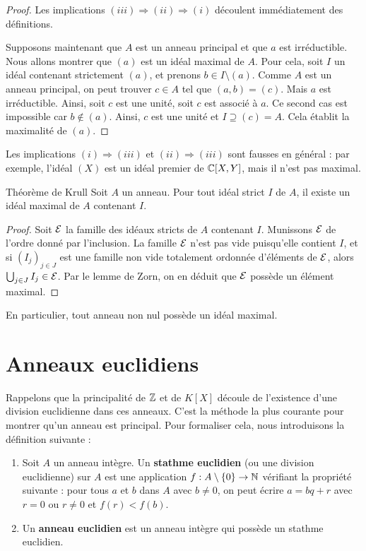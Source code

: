\documentclass[]{report}
\begin{document}
\begin{proof}
    Les implications $(iii) \Rightarrow (ii) \Rightarrow (i)$ découlent immédiatement des définitions.

    Supposons maintenant que $A$ est un anneau principal et que $a$ est irréductible. Nous allons montrer que $(a)$ est un idéal maximal de $A$. Pour cela, soit $I$ un idéal contenant strictement $(a)$, et prenons $b \in I \setminus (a)$. Comme $A$ est un anneau principal, on peut trouver $c \in A$ tel que $(a, b) = (c)$. Mais $a$ est irréductible. Ainsi, soit $c$ est une unité, soit $c$ est associé à $a$. Ce second cas est impossible car $b \notin (a)$. Ainsi, $c$ est une unité et $I \supseteq (c) = A$. Cela établit la maximalité de $(a)$.
\end{proof}

\begin{re}{}{}
    Les implications $(i) \Rightarrow (iii)$ et $(ii) \Rightarrow (iii)$ sont fausses en général : par exemple, l'idéal $(X)$ est un idéal premier de $\mathbb{C}[X, Y]$, mais il n'est pas maximal.
\end{re}

\begin{tm}{Théorème de Krull}{}
    Soit $A$ un anneau. Pour tout idéal strict $I$ de $A$, il existe un idéal maximal de $A$ contenant $I$.
\end{tm}

\begin{proof}
    Soit $\mathcal{E}$ la famille des idéaux stricts de $A$ contenant $I$. Munissons $\mathcal{E}$ de l'ordre donné par l'inclusion. La famille $\mathcal{E}$ n'est pas vide puisqu'elle contient $I$, et si $(I_j)_{j \in J}$ est une famille non vide totalement ordonnée d'éléments de $\mathcal{E}$, alors $\bigcup_{j \in J} I_j \in \mathcal{E}$. Par le lemme de Zorn, on en déduit que $\mathcal{E}$ possède un élément maximal.
\end{proof}

En particulier, tout anneau non nul possède un idéal maximal.

\section{Anneaux euclidiens}

Rappelons que la principalité de $\mathbb{Z}$ et de $K[X]$ découle de l'existence d'une division euclidienne dans ces anneaux. C'est la méthode la plus courante pour montrer qu'un anneau est principal. Pour formaliser cela, nous introduisons la définition suivante :

\begin{df}{}{}
    \begin{enumerate}
        \item Soit $A$ un anneau intègre. Un \textbf{stathme euclidien} (ou une division euclidienne) sur $A$ est une application $f : A \setminus \{0\} \to \mathbb{N}$ vérifiant la propriété suivante : pour tous $a$ et $b$ dans $A$ avec $b \neq 0$, on peut écrire $a = bq + r$ avec $r = 0$ ou $r \neq 0$ et $f(r) < f(b)$.
        \item Un \textbf{anneau euclidien} est un anneau intègre qui possède un stathme euclidien.
    \end{enumerate}
\end{df}
\end{document}
